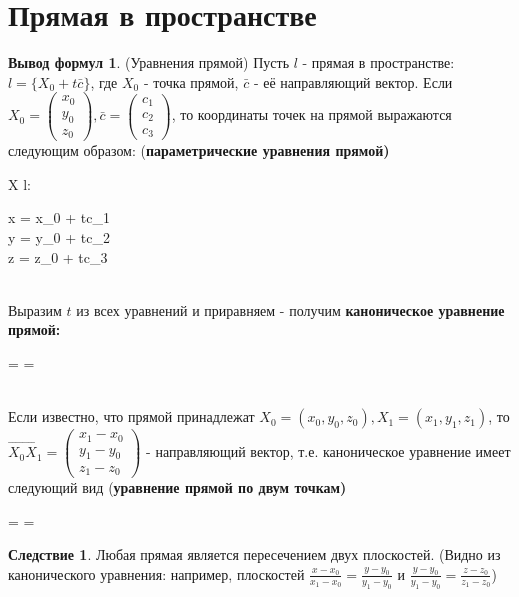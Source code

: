 \documentclass[a4paper, 12pt]{article}
\theoremstyle{definition}
\newtheorem*{consequense}{Следствие}
\newtheorem*{formulas}{Вывод формул}
\newenvironment{boxedalign*}
  {\begin{equation*}\begin{lrbox}{\boxedalignbox}$\begin{aligned}}
  {\end{aligned}$\end{lrbox}\fbox{\usebox{\boxedalignbox}}\end{equation*}}
\begin{document}
	\section{Прямая в пространстве}
	\begin{formulas}(Уравнения прямой)
		Пусть $l$ - прямая в пространстве: $l = \{X_0 + t\bar{c}\}$, где $X_0$ - точка прямой, $\bar{c}$ - её направляющий вектор. Если $X_0=\begin{pmatrix}x_{0}\\y_{0}\\z_0\end{pmatrix},\bar{c}=\begin{pmatrix}c_1\\c_2\\c_3\end{pmatrix}$, то координаты точек на прямой выражаются следующим образом: (\bfseries параметрические уравнения прямой\mdseries) \begin{boxedalign*}X \in l: \begin{cases}x = x_{0} + tc_1 \\ y = y_{0} + tc_2 \\ z = z_0 + tc_3\end{cases}\end{boxedalign*}\\
		Выразим $t$ из всех уравнений и приравняем - получим \bfseries каноническое уравнение прямой\mdseries : \begin{boxedalign*} =  = \end{boxedalign*}\\
		Если известно, что прямой принадлежат $X_0 = (x_{0}, y_{0}, z_0), X_1 = (x_{1}, y_{1}, z_1)$, то $\overrightarrow{X_0X_1} = \begin{pmatrix}x_{1} - x_{0}\\y_{1} - y_{0}\\z_1-z_0\end{pmatrix}$ - направляющий вектор, т.е. каноническое уравнение имеет следующий вид (\bfseries уравнение прямой по двум точкам\mdseries)\begin{boxedalign*} =  = \end{boxedalign*}
	\end{formulas}
	\begin{consequense}
		Любая прямая является пересечением двух плоскостей. (Видно из канонического уравнения: например, плоскостей $\frac{x-x_{0}}{x_{1}-x_{0}} = \frac{y-y_{0}}{y_{1}-y_{0}}$ и $\frac{y-y_{0}}{y_{1}-y_{0}} = \frac{z-z_{0}}{z_{1}-z_{0}}$) 
	\end{consequense}
\end{document}
